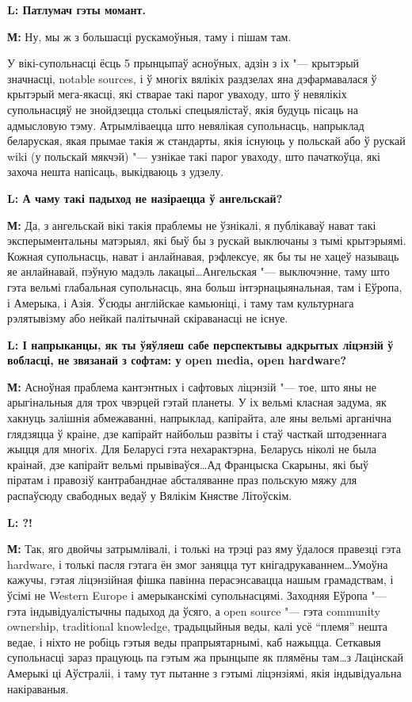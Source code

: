 \documentclass[10pt, a5paper]{article}
\begin{document}
{\noindent \bf L: Патлумач гэты момант.}

{\noindent \bf М:} Ну, мы ж з большасці рускамоўныя, таму і пішам там.

У вікі-супольнасці ёсць 5 прынцыпаў асноўных, адзін з іх "--- крытэрый значнасці, notable sources, і ў многіх вялікіх раздзелах яна дэфармавалася ў крытэрый мега-якасці, які стварае такі парог уваходу, што ў невялікіх супольнасцяў не знойдзецца столькі спецыялістаў, якія будуць пісаць на адмысловую тэму. Атрымліваецца што невялікая супольнасць, напрыклад беларуская, якая прымае такія ж стандарты, якія існуюць у польскай або ў рускай wіkі (у польскай мякчэй) "--- узнікае такі парог уваходу, што пачаткоўца, які захоча нешта напісаць, выкідваюць з удзелу.


{\noindent \bf L: А чаму такі падыход не назіраецца ў ангельскай?}

{\noindent \bf М:} Да, з ангельскай вікі такія праблемы не ўзнікалі, я публікаваў нават такі эксперыментальны матэрыял, які быў бы з рускай выключаны з тымі крытэрыямі. Кожная супольнасць, нават і анлайнавая, рэфлексуе, як бы ты не хацеў называць яе анлайнавай, пэўную мадэль лакацыі\ldots Ангельская "--- выключэнне, таму што гэта вельмі глабальная супольнасць, яна больш інтэрнацыянальная, там і Еўропа, і Амерыка, і Азія. Ўсюды англійскае камьюніці, і таму там культурнага рэлятывізму або нейкай палітычнай скіраванасці не існуе.
 
{\noindent \bf L: І напрыканцы, як ты ўяўляеш сабе перспектывы адкрытых ліцэнзій ў вобласці, не звязанай з софтам: у open media, open hardware?}

{\noindent \bf М:} Асноўная праблема кантэнтных і сафтовых ліцэнзій "--- тое, што яны не арыгінальныя для трох чвэрцей гэтай планеты. У іх вельмі класная задума, як хакнуць залішнія абмежаванні, напрыклад, капірайта, але яны вельмі арганічна глядзяцца ў краіне, дзе капірайт найбольш развіты і стаў часткай штодзеннага жыцця для многіх. Для Беларусі гэта нехарактэрна, Беларусь ніколі не была краінай, дзе капірайт вельмі прывіваўся\ldots Ад Францыска Скарыны, які быў піратам і правозіў кантрабанднае абсталяванне праз польскую мяжу для распаўсюду свабодных ведаў у Вялікім Княстве Літоўскім.


{\noindent \bf L: ?!}

{\noindent \bf М:} Так, яго двойчы затрымлівалі, і толькі на трэці раз яму ўдалося правезці гэта hardware, і толькі пасля гэтага ён змог заняцца тут кнігадрукаваннем\ldots Умоўна кажучы, гэтая ліцэнзійная фішка павінна перасэнсавацца нашым грамадствам, і ўсімі не Western Europe і амерыканскімі супольнасцямі. Заходняя Еўропа "--- гэта індывідуалістычны падыход да ўсяго, а open source "--- гэта communіty ownershіp, tradіtіonal knowledge, традыцыйныя веды, калі усё “племя” нешта ведае, і ніхто не робіць гэтыя веды прапрыятарнымі, каб нажыцца. Сеткавыя супольнасці зараз працуюць па гэтым жа прынцыпе як плямёны там\ldots з Лацінскай Амерыкі ці Аўстраліі, і таму тут пытанне з гэтымі ліцэнзіямі, якія індывідуальна накіраваныя.
\end{document}
